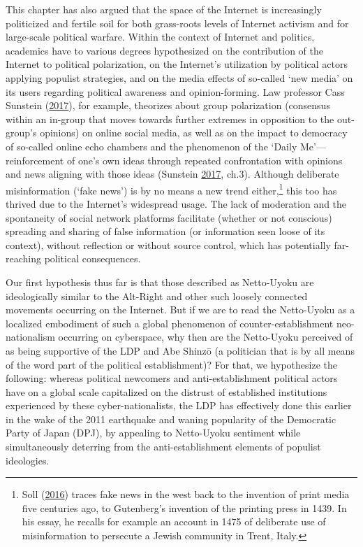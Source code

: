 \documentclass[10pt,british,A4paper,oneside]{memoir}
\begin{document}
This chapter has also argued that the space of the Internet is
increasingly politicized and fertile soil for both grass-roots levels of
Internet activism and for large-scale political warfare. Within the context
of Internet and politics, academics have to various degrees hypothesized
on the contribution of the Internet to political polarization, on the
Internet's utilization by political actors applying populist strategies,
and on the media effects of so-called `new media' on its users regarding
political awareness and opinion-forming. Law professor Cass Sunstein
(\protect\hyperlink{ref-sunstein_republic:_2017}{2017}), for example,
theorizes about group polarization (consensus within an in-group that
moves towards further extremes in opposition to the out-group's
opinions) on online social media, as well as on the impact to democracy
of so-called online echo chambers and the phenomenon of the `Daily
Me'---reinforcement of one's own ideas through repeated confrontation with
opinions and news aligning with those ideas (Sunstein
\protect\hyperlink{ref-sunstein_republic:_2017}{2017}, ch.3). Although
deliberate misinformation (`fake news') is by no means a new trend
either,\footnote{Soll (\protect\hyperlink{ref-soll_long_2016}{2016})
  traces fake news in the west back to the invention of print media five
  centuries ago, to Gutenberg's invention of the printing press in 1439.
  In his essay, he recalls for example an account in 1475 of deliberate
  use of misinformation to persecute a Jewish community in Trent, Italy.}
this too has thrived due to the Internet's widespread usage. The lack of
moderation and the spontaneity of social network platforms facilitate (whether or not conscious) spreading and sharing of false information (or
information seen loose of its context), without reflection or without
source control, which has potentially far-reaching political consequences.

Our first hypothesis thus far is that those described as Netto-Uyoku are
ideologically similar to the Alt-Right and other such loosely connected
movements occurring on the Internet. But if we are to read the
Netto-Uyoku as a localized embodiment of such a global phenomenon of
counter-establishment neo-nationalism occurring on cyberspace, why then
are the Netto-Uyoku perceived of as being supportive of the LDP and Abe
Shinzō (a politician that is by all means of the word part of the
political establishment)? For that, we hypothesize the following:
whereas political newcomers and anti-establishment political actors have on a global
scale capitalized on the distrust of established institutions
experienced by these cyber-nationalists, the LDP has effectively done
this earlier in the wake of the 2011 earthquake and waning popularity of
the Democratic Party of Japan (DPJ), by appealing to Netto-Uyoku
sentiment while simultaneously deterring from the anti-establishment
elements of populist ideologies.
\end{document}
